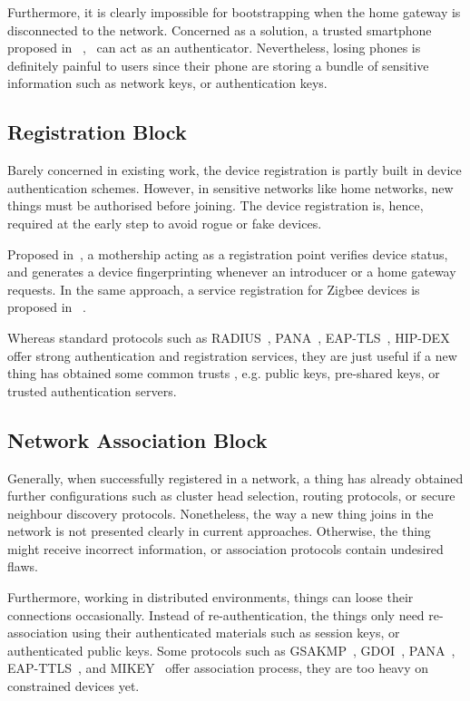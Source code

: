 Furthermore, it is clearly impossible for bootstrapping when the home gateway is disconnected to the network. Concerned as a solution, a trusted smartphone proposed in ~\cite{Seung2015},~\cite{6934398} can act as an authenticator. Nevertheless, losing phones is definitely painful to users since their phone are storing a bundle of sensitive information such as network keys, or authentication keys. 

\subsection{Registration Block}
Barely concerned in existing work, the device registration is partly built in device authentication schemes. However, in sensitive networks like home networks, new things must be authorised before joining. The device registration is, hence, required at the early step to avoid rogue or fake devices. 

Proposed in~\cite{Jeanning2013}, a mothership acting as a registration point verifies device status, and generates a device fingerprinting whenever an introducer or a home gateway requests. In the same approach, a service registration for Zigbee devices is proposed in ~\cite{5174409}.

Whereas standard protocols such as RADIUS~\cite{RADIUS}, PANA~\cite{rfc5191, Sarikaya2015}, EAP-TLS~\cite{eaptls}, HIP-DEX~\cite{hipdex} offer strong authentication and registration services, they are just useful if a new thing has obtained some common trusts , e.g. public keys, pre-shared keys, or trusted authentication servers.

\subsection{Network Association Block}
Generally, when successfully registered in a network, a thing has already obtained further configurations such as cluster head selection, routing protocols, or secure neighbour discovery protocols. Nonetheless, the way a new thing joins in the network is not presented clearly in current approaches. Otherwise, the thing might receive incorrect information, or association protocols contain undesired flaws. 

Furthermore, working in distributed environments, things can loose their connections occasionally. Instead of re-authentication, the things only need re-association using their authenticated materials such as session keys, or authenticated public keys. Some protocols such as GSAKMP~\cite{gsakmp}, GDOI~\cite{gdoi}, PANA~\cite{rfc5191}, EAP-TTLS~\cite{EAP-TTLSv0}, and MIKEY~\cite{MIKEY} offer association process, they are too heavy on constrained devices yet. 


